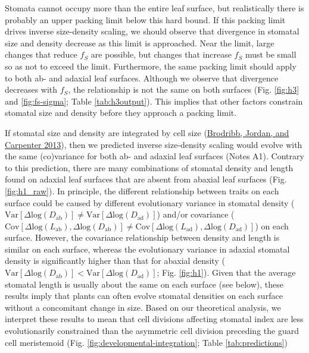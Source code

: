\documentclass[
  12pt,
]{article}
\begin{document}
Stomata cannot occupy more than the entire leaf surface, but realistically there is probably an upper packing limit below this hard bound. If this packing limit drives inverse size-density scaling, we should observe that divergence in stomatal size and density decrease as this limit is approached. Near the limit, large changes that reduce \(f_S\) are possible, but changes that increase \(f_S\) must be small so as not to exceed the limit. Furthermore, the same packing limit should apply to both ab- and adaxial leaf surfaces. Although we observe that divergence decreases with \(f_S\), the relationship is not the same on both surfaces (Fig. \ref{fig:h3} and \ref{fig:fs-sigma}; Table \ref{tab:h3output}). This implies that other factors constrain stomatal size and density before they approach a packing limit.

If stomatal size and density are integrated by cell size (\protect\hyperlink{ref-brodribb_unified_2013}{Brodribb, Jordan, and Carpenter 2013}), then we predicted inverse size-density scaling would evolve with the same (co)variance for both ab- and adaxial leaf surfaces (Notes A1). Contrary to this prediction, there are many combinations of stomatal density and length found on adaxial leaf surfaces that are absent from abaxial leaf surfaces (Fig. \ref{fig:h1_raw}). In principle, the different relationship between traits on each surface could be caused by different evolutionary variance in stomatal density (\(\text{Var}[\Delta \text{log}(D_\text{ab})] \ne \text{Var}[\Delta \text{log}(D_\text{ad})]\)) and/or covariance (\(\text{Cov}[\Delta \text{log}(L_\text{ab}), \Delta \text{log}(D_\text{ab})] \ne \text{Cov}[\Delta \text{log}(L_\text{ad}), \Delta \text{log}(D_\text{ad})]\)) on each surface. However, the covariance relationship between density and length is similar on each surface, whereas the evolutionary variance in adaxial stomatal density is significantly higher than that for abaxial density (\(\text{Var}[\Delta \text{log}(D_\text{ab})] < \text{Var}[\Delta \text{log}(D_\text{ad})]\); Fig. \ref{fig:h1}). Given that the average stomatal length is usually about the same on each surface (see below), these results imply that plants can often evolve stomatal densities on each surface without a concomitant change in size. Based on our theoretical analysis, we interpret these results to mean that cell divisions affecting stomatal index are less evolutionarily constrained than the asymmetric cell division preceding the guard cell meristemoid (Fig. \ref{fig:developmental-integration}; Table \ref{tab:predictions})
\end{document}
